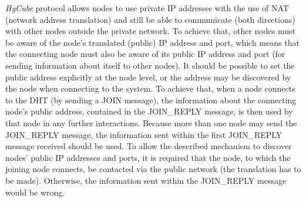 \emph{HyCube} protocol allows nodes to use private IP addresses with the use of NAT (network address translation) and still be able to communicate (both directions) with other nodes outside the private network. To achieve that, other nodes must be aware of the node's translated (public) IP address and port, which means that the connecting node must also be aware of its public IP address and port (for sending information about itself to other nodes). It should be possible to set the public address explicitly at the node level, or the address may be discovered by the node when connecting to the system. To achieve that, when a node connects to the DHT (by sending a JOIN message), the information about the connecting node's public address, contained in the JOIN\_REPLY message, is then used by that node in any further interactions. Because more than one node may send the JOIN\_REPLY message, the information sent within the first JOIN\_REPLY message received should be used. To allow the described mechanism to discover nodes' public IP addresses and ports, it is required that the node, to which the joining node connects, be contacted via the public network (the translation has to be made). Otherwise, the information sent within the JOIN\_REPLY message would be wrong.










